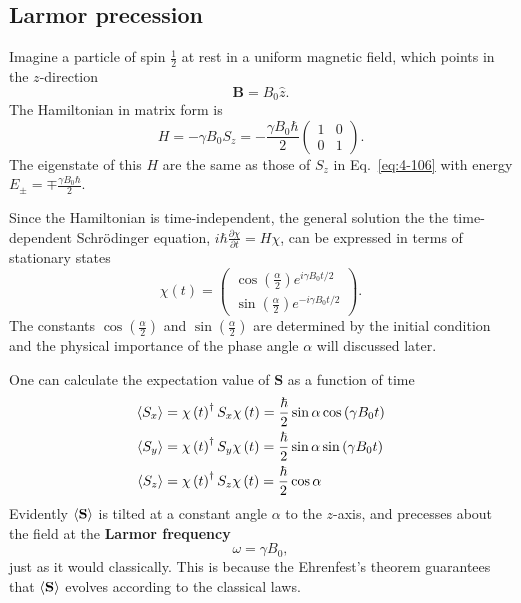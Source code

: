 \subsection{Larmor precession}
Imagine a particle of spin $\frac{1}{2}$ at rest in a uniform magnetic field, which points in the $z$-direction
\begin{equation}
  \label{eq:4-111}
 \mathbf{B} = B_0 \hat{z}.
\end{equation}
The Hamiltonian in matrix form is
\begin{equation}
  \label{eq:4-112}
 H = - \gamma B_0 S_z = - \frac{\gamma B_0 \hbar}{2}
 \begin{pmatrix}
   1 & 0 \\
   0 & 1
 \end{pmatrix}.
\end{equation}
The eigenstate of this $H$ are the same as those of $S_z$ in Eq.~\eqref{eq:4-106} with energy $E_{\pm} = \mp \frac{\gamma B_0 \hbar}{2}$.

Since the Hamiltonian is time-independent, the general solution the the time-dependent Schr\"odinger equation, $i\hbar \frac{\partial \chi }{\partial t} = H \chi$, can be expressed in terms of stationary states
\begin{equation*}
  \chi \left( t \right) =
  \begin{pmatrix}
    \cos \left( \frac{\alpha}{2} \right) e^{i\gamma B_0 t/2} \\
    \sin \left( \frac{\alpha}{2} \right)  e^{-i \gamma B_0 t/2}
  \end{pmatrix}.
\end{equation*}
The constants $\cos \left( \frac{\alpha}{2} \right)$ and $\sin \left( \frac{\alpha}{2} \right)$ are determined by the initial condition and the physical importance of the phase angle $\alpha$ will discussed later.

One can calculate the expectation value of $\mathbf{S}$ as a function of time
\begin{align}
  \label{eq:4-113}
 \expval{S_x} &= \chi \left( t \right)^{\dagger} S_x \chi \left( t \right) = \frac{\hbar}{2} \sin \alpha \cos \left( \gamma B_0 t \right) \\
  \label{eq:4-114}
 \expval{S_y} &= \chi \left( t \right)^{\dagger} S_y \chi \left( t \right) = \frac{\hbar}{2} \sin \alpha \sin \left( \gamma B_0 t \right) \\
  \label{eq:4-115}
 \expval{S_z} &= \chi \left( t \right)^{\dagger} S_z \chi \left( t \right) = \frac{\hbar}{2} \cos \alpha
\end{align}
Evidently $\expval{\mathbf{S}}$ is tilted at a constant angle $\alpha$ to the $z$-axis, and precesses about the field at the \textbf{Larmor frequency}
\begin{equation}
  \label{eq:4-116}
 \omega = \gamma B_0,
\end{equation}
just as it would classically.
This is because the Ehrenfest's theorem guarantees that $\expval{\mathbf{S}}$ evolves according to the classical laws.

